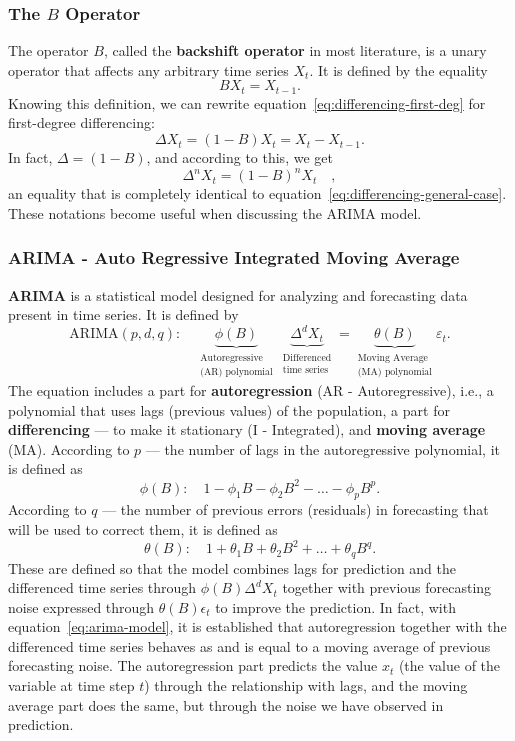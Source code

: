 \documentclass[a4paper,11pt]{article}
\begin{document}
\subsubsection{The $B$ Operator}
The operator $B$, called the \textbf{backshift operator} in most literature, is a unary operator that affects any arbitrary time series $X_t$. It is defined by the equality
$$
BX_t = X_{t-1}.
$$
Knowing this definition, we can rewrite equation~\ref{eq:differencing-first-deg} for first-degree differencing:
$$
\Delta X_t = (1-B)X_t=X_t-X_{t-1}.
$$
In fact, $\Delta = (1-B)$, and according to this, we get
$$
\Delta^nX_t = (1-B)^nX_t\quad,
$$
an equality that is completely identical to equation~\ref{eq:differencing-general-case}. These notations become useful when discussing the ARIMA model.
\subsubsection{ARIMA - Auto Regressive Integrated Moving Average}
\textbf{ARIMA} is a statistical model designed for analyzing and forecasting data present in time series. It is defined by
\begin{equation}
    \label{eq:arima-model}
    \text{ARIMA}(p,d,q): \quad 
    \underbrace{\phi(B)}_{\substack{\text{Autoregressive} \\ \text{(AR) polynomial}}} \,
    \underbrace{\Delta^d X_t}_{\substack{\text{Differenced} \\ \text{time series}}} 
    = 
    \underbrace{\theta(B)}_{\substack{\text{Moving Average} \\ \text{(MA) polynomial}}} 
    \varepsilon_t.
\end{equation}
The equation includes a part for \textbf{autoregression} (AR - Autoregressive), i.e., a polynomial that uses lags (previous values) of the population, a part for \textbf{differencing} — to make it stationary (I - Integrated), and \textbf{moving average} (MA). According to $p$ — the number of lags in the autoregressive polynomial, it is defined as
$$
\phi(B):\quad1-\phi_1B-\phi_2B^2 -\dots- \phi_pB^p.
$$
According to $q$ — the number of previous errors (residuals) in forecasting that will be used to correct them, it is defined as
$$
\theta(B):\quad1+\theta_1B+\theta_2B^2 +\dots+\theta_qB^q.
$$
These are defined so that the model combines lags for prediction and the differenced time series through $\phi(B)\Delta^dX_t$ together with previous forecasting noise expressed through $\theta(B)\epsilon_t$ to improve the prediction. In fact, with equation~\eqref{eq:arima-model}, it is established that autoregression together with the differenced time series behaves as and is equal to a moving average of previous forecasting noise. The autoregression part predicts the value $x_t$ (the value of the variable at time step $t$) through the relationship with lags, and the moving average part does the same, but through the noise we have observed in prediction.
\end{document}
